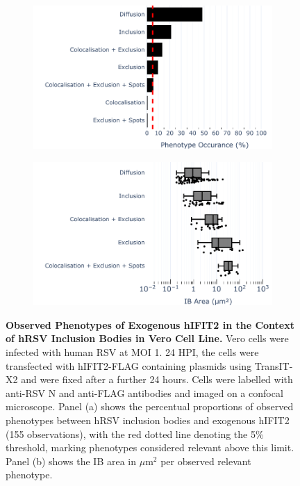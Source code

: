 \begin{figure}
    \begin{subfigure}{0.495\textwidth}
        \caption{}
        \includegraphics[width=1\linewidth]{09. Chapter 4/Figs/02. Overexpression/02. IFIT2/01. bar_hi2f_hrsv.pdf} 
    \end{subfigure}
    \begin{subfigure}{0.495\textwidth}
        \caption{}
        \includegraphics[width=1\linewidth]{09. Chapter 4/Figs/02. Overexpression/02. IFIT2/02. box_hi2f_hrsv.pdf}
    \end{subfigure}
    \caption[Observed Phenotypes of Exogenous hIFIT2 in the Context of hRSV Inclusion Bodies in Vero Cell Line.]{\textbf{Observed Phenotypes of Exogenous hIFIT2 in the Context of hRSV Inclusion Bodies in Vero Cell Line.} Vero cells were infected with human RSV at MOI 1. 24 HPI, the cells were transfected with hIFIT2-FLAG containing plasmids using TransIT-X2 and were fixed after a further 24 hours. Cells were labelled with anti-RSV N and anti-FLAG antibodies and imaged on a confocal microscope. Panel (a) shows the percentual proportions of observed phenotypes between hRSV inclusion bodies and exogenous hIFIT2 (155 observations), with the red dotted line denoting the 5\% threshold, marking phenotypes considered relevant above this limit. Panel (b) shows the IB area in \(\mu \mbox{m}^2\) per observed relevant phenotype.}
    \label{fig:Observed Phenotypes of Exogenous hIFIT2 in the Context of hRSV Inclusion Bodies in Vero Cell Line}
\end{figure}


